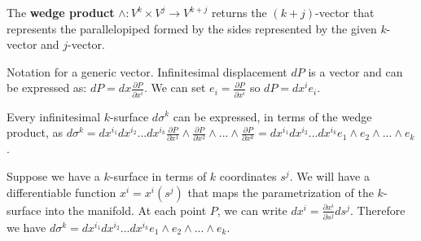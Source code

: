 \documentclass[11pt,letterpaper,fleqn]{memoir}
\begin{document}
\begin{defn}
	The \textbf{wedge product} $\wedge : V^k\times V^j \to V^{k+j}$ returns the $(k+j)$-vector that represents the parallelopiped formed by the sides represented by the given $k$-vector and $j$-vector. 
\end{defn}


\begin{remark}
	Notation for a generic vector. Infinitesimal displacement $dP$ is a vector and can be expressed as: $dP = dx \frac{\partial P}{\partial x^i}$. We can set $e_i = \frac{\partial P}{\partial x^i}$ so $dP = dx^i e_i$.
	
	Every infinitesimal $k$-surface $d\sigma^k$ can be expressed, in terms of the wedge product, as $d\sigma^k= dx^{i_1}dx^{i_2}...dx^{i_k}\frac{\partial P}{\partial x^1} \wedge \frac{\partial P}{\partial x^2} \wedge ... \wedge \frac{\partial P}{\partial x^k} = dx^{i_1}dx^{i_2}...dx^{i_k} e_1 \wedge e_2 \wedge ... \wedge e_k$.
	
	Suppose we have a $k$-surface in terms of $k$ coordinates $s^j$. We will have a differentiable function $x^i = x^i(s^j)$ that maps the parametrization of the $k$-surface into the manifold. At each point $P$, we can write $dx^i = \frac{\partial x^i}{\partial s^j} ds^j$. Therefore we have $d\sigma^k = dx^{i_1}dx^{i_2}...dx^{i_k} e_1 \wedge e_2 \wedge ... \wedge e_k$.
	

\end{remark}
\end{document}
